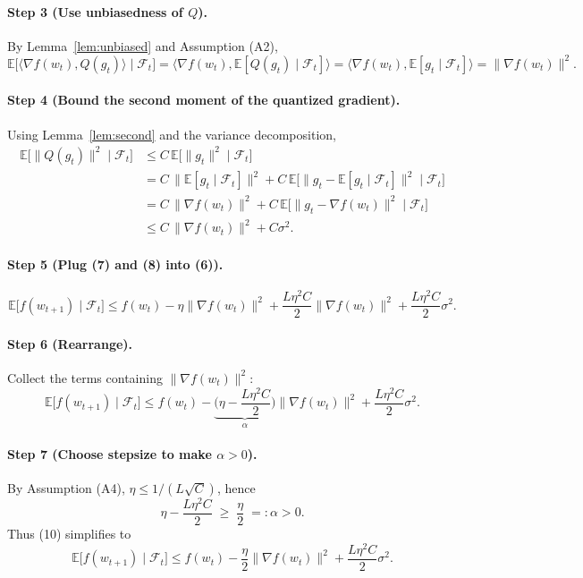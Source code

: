 \documentclass{article}
\newcommand{\E}{\mathbb{E}}
\begin{document}
\paragraph{Step 3 (Use unbiasedness of $Q$).}
By Lemma~\ref{lem:unbiased} and Assumption (A2),
\[
\E\!\big[\langle\nabla f(w_t),Q(g_t)\rangle\mid\mathcal{F}_t\big]
= \big\langle\nabla f(w_t),\E[Q(g_t)\mid\mathcal{F}_t]\big\rangle
= \big\langle\nabla f(w_t),\E[g_t\mid\mathcal{F}_t]\big\rangle
= \|\nabla f(w_t)\|^{2}.                                            \tag{7}
\]
\paragraph{Step 4 (Bound the second moment of the quantized gradient).}
Using Lemma~\ref{lem:second} and the variance decomposition,
\[
\begin{aligned}
\E\!\big[\|Q(g_t)\|^{2}\mid\mathcal{F}_t\big]
&\le C\,\E\!\big[\|g_t\|^{2}\mid\mathcal{F}_t\big] \\
&= C\,\big\|\E[g_t\mid\mathcal{F}_t]\big\|^{2}
   + C\,\E\!\big[\|g_t-\E[g_t\mid\mathcal{F}_t]\|^{2}\mid\mathcal{F}_t\big]  \\
&= C\,\|\nabla f(w_t)\|^{2}+C\,\E\!\big[\|g_t-\nabla f(w_t)\|^{2}\mid\mathcal{F}_t\big] \\
&\le C\,\|\nabla f(w_t)\|^{2}+C\sigma^{2}.                         \tag{8}
\end{aligned}
\]
\paragraph{Step 5 (Plug (7) and (8) into (6)).}
\[
\E\!\big[f(w_{t+1})\mid\mathcal{F}_t\big]
\le f(w_t)-\eta\|\nabla f(w_t)\|^{2}
   +\frac{L\eta^{2}C}{2}\|\nabla f(w_t)\|^{2}
   +\frac{L\eta^{2}C}{2}\sigma^{2}.                               \tag{9}
\]
\paragraph{Step 6 (Rearrange).}
Collect the terms containing $\|\nabla f(w_t)\|^{2}$:
\[
\E\!\big[f(w_{t+1})\mid\mathcal{F}_t\big]
\le f(w_t)-\underbrace{\Big(\eta-\frac{L\eta^{2}C}{2}\Big)}_{\displaystyle\alpha}
   \|\nabla f(w_t)\|^{2}
   +\frac{L\eta^{2}C}{2}\sigma^{2}.                               \tag{10}
\]
\paragraph{Step 7 (Choose stepsize to make $\alpha>0$).}
By Assumption (A4), $\eta\le 1/(L\sqrt{C})$, hence
\[
\eta-\frac{L\eta^{2}C}{2}\;\ge\;\frac{\eta}{2}\;=: \alpha>0.          \tag{11}
\]
Thus (10) simplifies to
\[
\E\!\big[f(w_{t+1})\mid\mathcal{F}_t\big]
\le f(w_t)-\frac{\eta}{2}\|\nabla f(w_t)\|^{2}
   +\frac{L\eta^{2}C}{2}\sigma^{2}.                               \tag{12}
\]
\end{document}
